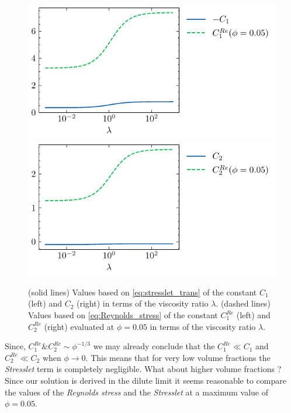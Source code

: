 \begin{figure}
    \centering
    \includegraphics[height=0.25\textwidth]{image/Theory/C1.pdf}
    \includegraphics[height=0.25\textwidth]{image/Theory/C2.pdf}
    \caption{
    (solid lines) Values based on \ref{eq:stresslet_trans} of the constant $C_1$ (left)  and $C_2$ (right) in terms of the viscosity ratio $\lambda$.
    (dashed lines) Values based on \ref{eq:Reynolds_stress} of the constant $C_1^{Re}$ (left) and $C_2^{Re}$ (right)  evaluated at $\phi = 0.05$ in terms of the viscosity ratio $\lambda$.
    }
    \label{fig:relative_comparaison}
\end{figure}
Since, $C_1^{Re} \& C_2^{Re} \sim \phi^{-1/3}$ we may already conclude that the $C_1^{Re} \ll C_1$ and $C_2^{Re} \ll C_2$ when $\phi \to 0$. 
This means that for very low volume fractions the \textit{Stresslet} term is completely negligible. 
What about higher volume fractions ? 
Since our solution is derived in the dilute limit it seems reasonable to compare the values of the \textit{Reynolds stress} and the \textit{Stresslet} at a maximum value of $\phi = 0.05$. 



